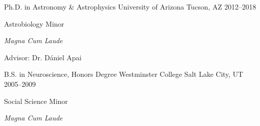 

\begin{degrees}

  \degree
    {Ph.D. in Astronomy \& Astrophysics} %
    {University of Arizona} %
    {Tucson, AZ} %
    {2012--2018} %
    {
      \begin{cvitems} %
        \item {Astrobiology Minor}
        \item {\textit{Magna Cum Laude}}
        \item {Advisor: Dr. D\'aniel Apai}
      \end{cvitems}
    }

  \degree
    {B.S. in Neuroscience, Honors Degree} %
    {Westminster College} %
    {Salt Lake City, UT} %
    {2005--2009} %
    {
      \begin{cvitems} %
        \item {Social Science Minor}
        \item {\textit{Magna Cum Laude}}
      \end{cvitems}
    }

\end{degrees}
